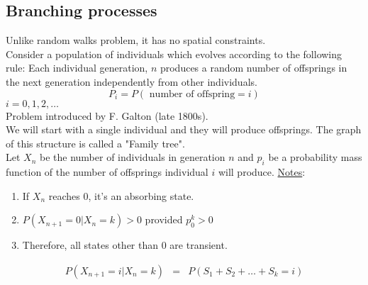   \subsection*{Branching processes}
    Unlike random walks problem, it has no spatial constraints.\\

    Consider a population of individuals which evolves according to the following
    rule: Each individual generation, $n$ produces a random number of 
    offsprings in the next generation independently from other individuals.\\

    $$
      P_i = P(\text{ number of offspring} = i)
    $$
    $i = 0, 1, 2, \ldots$\\
    
    Problem introduced by F. Galton (late 1800s). \\

    We will start with a single individual and they will produce offsprings.
    The graph of this structure is called a "Family tree".\\

    Let $X_n$ be the number of individuals in generation $n$ and $p_i$ be
    a probability mass function of the number of offsprings individual $i$
    will produce.
    \underline{Notes}:
    \begin{enumerate}
      \item If $X_n$ reaches 0, it's an absorbing state.
      \item $P(X_{n+1} = 0 | X_n = k) > 0$ provided $p_0^k > 0$
      \item Therefore, all states other than 0 are transient.
    \end{enumerate}
    \begin{eqnarray*}
      P(X_{n+1} = i | X_n = k) & = & P(S_1 + S_2 + \ldots + S_k = i)\\
    \end{eqnarray*}
